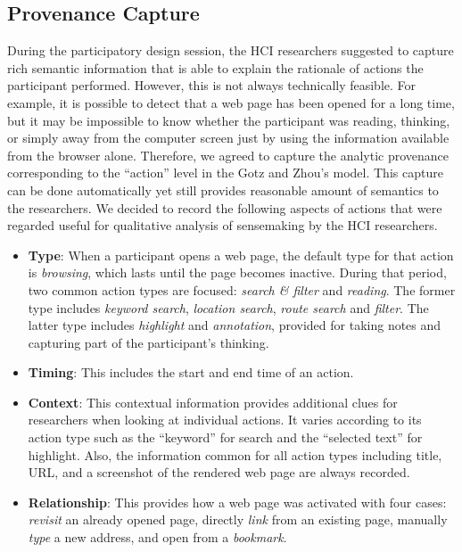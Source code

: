 \subsection{Provenance Capture}
\label{sub:sp-provenance}
During the participatory design session, the HCI researchers suggested to capture rich semantic  information that is able to explain the rationale of actions the participant performed. However, this is not always technically feasible. For example, it is possible to detect that a web page has been opened for a long time, but it may be impossible to know whether the participant was reading, thinking, or simply away from the computer screen just by using the information available from the browser alone. Therefore, we agreed to capture the analytic provenance corresponding to the ``action'' level in the Gotz and Zhou's model. This capture can be done automatically yet still provides reasonable amount of semantics to the researchers. We decided to record the following aspects of actions that were regarded useful for qualitative analysis of sensemaking by the HCI researchers.

\begin{itemize}
	\item \textbf{Type}: When a participant opens a web page, the default type for that action is \emph{browsing}, which lasts until the page becomes inactive. During that period, two common action types are focused: \emph{search \& filter} and \emph{reading}. The former type includes \emph{keyword search}, \emph{location search}, \emph{route search} and \emph{filter}. The latter type includes \emph{highlight} and \emph{annotation}, provided for taking notes and capturing part of the participant's thinking.

	\item \textbf{Timing}: This includes the start and end time of an action.

	\item \textbf{Context}: This contextual information provides additional clues for researchers when looking at individual actions. It varies according to its action type such as the ``keyword'' for search and the ``selected text'' for highlight. Also, the information common for all action types including title, URL, and a screenshot of the rendered web page are always recorded.

	\item \textbf{Relationship}: This provides how a web page was activated with four cases: \emph{revisit} an already opened page, directly \textit{link} from an existing page, manually \textit{type} a new address, and open from a \emph{bookmark}.
\end{itemize}


